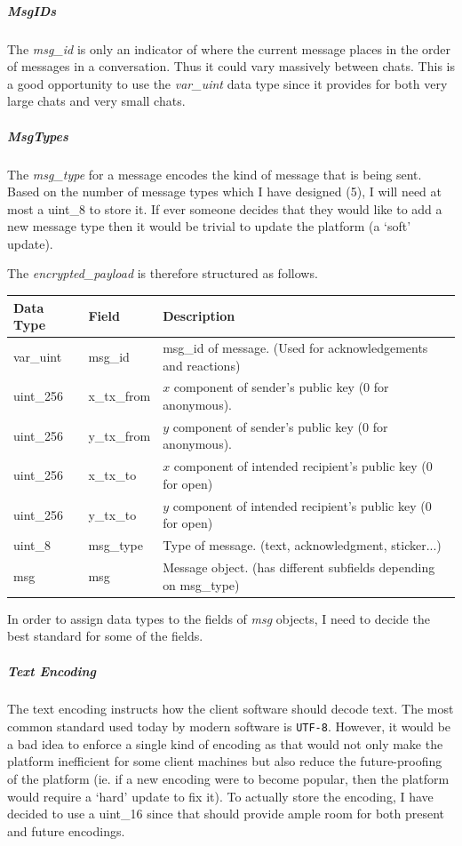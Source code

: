 \documentclass{article}
\begin{document}
\subparagraph{MsgIDs}
The \textit{msg\_id} is only an indicator of where the current message places in the order of messages in a conversation. Thus it could vary massively between chats. This is a good opportunity to use the \textit{var\_uint} data type since it provides for both very large chats and very small chats. 

\subparagraph{MsgTypes}
The \textit{msg\_type} for a message encodes the kind of message that is being sent. Based on the number of message types which I have designed (5), I will need at most a uint\_8 to store it. If ever someone decides that they would like to add a new message type then it would be trivial to update the platform (a `soft' update).

The \textit{encrypted\_payload} is therefore structured as follows.
\begin{table}[H]
\centering
\begin{tabular}{|p{1.3cm}|p{2.5cm}|p{5.5cm}|}
\hline
\rowcolor{tblgrey}
Data Type   & Field & Description\\ \hline
var\_uint   & msg\_id     & msg\_id of message. (Used for acknowledgements and reactions)\\ \hline
uint\_256   & x\_tx\_from & $x$ component of sender's public key (0 for anonymous).      \\ \hline
uint\_256   & y\_tx\_from & $y$ component of sender's public key (0 for anonymous).      \\ \hline
uint\_256   & x\_tx\_to   & $x$ component of intended recipient's public key (0 for open)\\ \hline
uint\_256   & y\_tx\_to   & $y$ component of intended recipient's public key (0 for open)\\ \hline
uint\_8     & msg\_type   & Type of message. (text, acknowledgment, sticker...)          \\ \hline
msg         & msg         & Message object. (has different subfields depending on msg\_type) \\ \hline
\end{tabular}
\end{table}

In order to assign data types to the fields of \textit{msg} objects, I need to decide the best standard for some of the fields.

\subparagraph{Text Encoding}
The text encoding instructs how the client software should decode text. The most common standard used today by modern software is \texttt{UTF-8}. However, it would be a bad idea to enforce a single kind of encoding as that would not only make the platform inefficient for some client machines but also reduce the future-proofing of the platform (ie. if a new encoding were to become popular, then the platform would require a `hard' update to fix it). To actually store the encoding, I have decided to use a uint\_16 since that should provide ample room for both present and future encodings.
\end{document}
